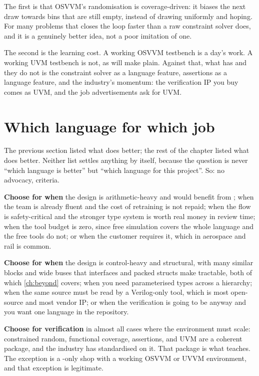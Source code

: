 The first is that OSVVM's randomisation is coverage-driven: it biases the next
draw towards bins that are still empty, instead of drawing uniformly and
hoping. For many problems that closes the loop faster than a raw constraint
solver does, and it is a genuinely better idea, not a poor imitation of one.

The second is the learning cost. A working OSVVM testbench is a day's work. A
working UVM testbench is not, as  will make plain. Against that,
what \SV{} has and they do not is the constraint solver as a language feature,
assertions as a language feature, and the industry's momentum: the
verification IP you buy comes as UVM, and the job advertisements ask for UVM.

\section{Which language for which job}
\label{sec:philosophy:which}
\label{sec:beyond:which}

The previous section listed what \VHDL{} does better; the rest of the chapter
listed what \SV{} does better. Neither list settles anything by itself,
because the question is never ``which language is better'' but ``which
language for this project''. So: no advocacy, criteria.

\textbf{Choose \VHDL{} for \RTL{} when} the design is arithmetic-heavy and
would benefit from ; when the team is already fluent and the
cost of retraining is not repaid; when the flow is safety-critical and the
stronger type system is worth real money in review time; when the tool budget
is zero, since free \VHDL{} simulation covers the whole language and the free
\SV{} tools do not; or when the customer requires it, which in aerospace and
rail is common.

\textbf{Choose \SV{} for \RTL{} when} the design is control-heavy and
structural, with many similar blocks and wide buses that interfaces and packed
structs make tractable, both of which \cref{ch:beyond} covers; when you need parameterised
types across a hierarchy; when the same source must be read by a Verilog-only
tool, which is most open-source \RTL{} and most vendor IP; or when the
verification is going to be \SV{} anyway and you want one language in the
repository.

\textbf{Choose \SV{} for verification} in almost all cases where the
environment must scale: constrained random, functional coverage, assertions,
and UVM are a coherent package, and the industry has standardised on it. That
package is what  teaches. The exception is a
\VHDL{}-only shop with a working OSVVM or UVVM environment, and that exception
is legitimate.

